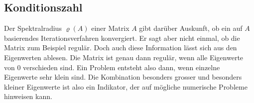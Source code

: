 %
%

\subsection{Konditionszahl
\label{buch:subsection:konditionszahl}}
Der Spektralradius $\varrho(A)$ einer Matrix $A$ gibt darüber Auskunft,
ob ein auf $A$ basierendes Iterationsverfahren konvergiert.
Er sagt aber nicht einmal, ob die Matrix zum Beispiel regulär.
Doch auch diese Information lässt sich aus den Eigenwerten ablesen.
Die Matrix ist genau dann regulär, wenn alle Eigenwerte von $0$ verschieden
sind.
Ein Problem entsteht also dann, wenn einzelne Eigenwerte sehr klein sind.
Die Kombination besonders grosser und besonders kleiner Eigenwerte 
ist also ein Indikator, der auf mögliche numerische Probleme hinweisen kann.

